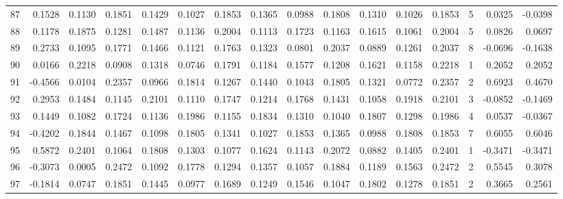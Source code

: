 \begin{tabular}{lrrrrrrrrrrrrrrr}
87  &      0.1528 &  0.1130 &  0.1851 &  0.1429 &  0.1027 &  0.1853 &  0.1365 &  0.0988 &  0.1808 &  0.1310 &   0.1026 &     0.1853 &      5 &                    0.0325 &                    -0.0398 \\
88  &      0.1178 &  0.1875 &  0.1281 &  0.1487 &  0.1136 &  0.2004 &  0.1113 &  0.1723 &  0.1163 &  0.1615 &   0.1061 &     0.2004 &      5 &                    0.0826 &                     0.0697 \\
89  &      0.2733 &  0.1095 &  0.1771 &  0.1466 &  0.1121 &  0.1763 &  0.1323 &  0.0801 &  0.2037 &  0.0889 &   0.1261 &     0.2037 &      8 &                   -0.0696 &                    -0.1638 \\
90  &      0.0166 &  0.2218 &  0.0908 &  0.1318 &  0.0746 &  0.1791 &  0.1184 &  0.1577 &  0.1208 &  0.1621 &   0.1158 &     0.2218 &      1 &                    0.2052 &                     0.2052 \\
91  &     -0.4566 &  0.0104 &  0.2357 &  0.0966 &  0.1814 &  0.1267 &  0.1440 &  0.1043 &  0.1805 &  0.1321 &   0.0772 &     0.2357 &      2 &                    0.6923 &                     0.4670 \\
92  &      0.2953 &  0.1484 &  0.1145 &  0.2101 &  0.1110 &  0.1747 &  0.1214 &  0.1768 &  0.1431 &  0.1058 &   0.1918 &     0.2101 &      3 &                   -0.0852 &                    -0.1469 \\
93  &      0.1449 &  0.1082 &  0.1724 &  0.1136 &  0.1986 &  0.1155 &  0.1834 &  0.1310 &  0.1040 &  0.1807 &   0.1298 &     0.1986 &      4 &                    0.0537 &                    -0.0367 \\
94  &     -0.4202 &  0.1844 &  0.1467 &  0.1098 &  0.1805 &  0.1341 &  0.1027 &  0.1853 &  0.1365 &  0.0988 &   0.1808 &     0.1853 &      7 &                    0.6055 &                     0.6046 \\
95  &      0.5872 &  0.2401 &  0.1064 &  0.1808 &  0.1303 &  0.1077 &  0.1624 &  0.1143 &  0.2072 &  0.0882 &   0.1405 &     0.2401 &      1 &                   -0.3471 &                    -0.3471 \\
96  &     -0.3073 &  0.0005 &  0.2472 &  0.1092 &  0.1778 &  0.1294 &  0.1357 &  0.1057 &  0.1884 &  0.1189 &   0.1563 &     0.2472 &      2 &                    0.5545 &                     0.3078 \\
97  &     -0.1814 &  0.0747 &  0.1851 &  0.1445 &  0.0977 &  0.1689 &  0.1249 &  0.1546 &  0.1047 &  0.1802 &   0.1278 &     0.1851 &      2 &                    0.3665 &                     0.2561 \\

\end{tabular}
